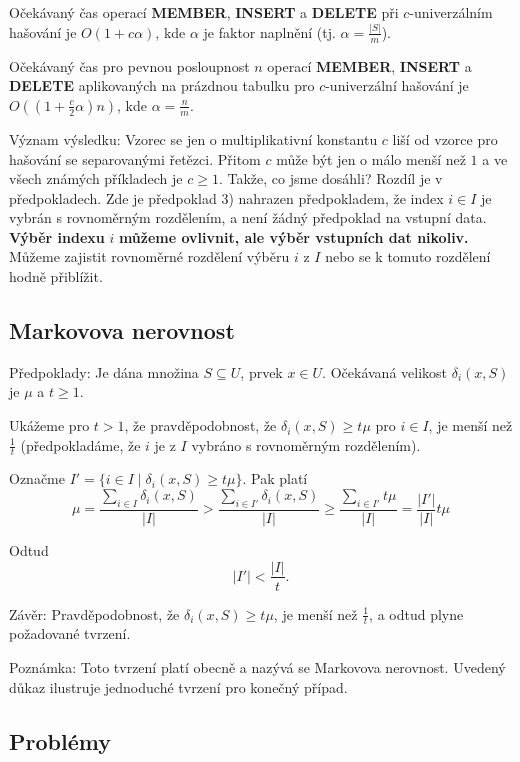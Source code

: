 \documentclass[a4paper,12pt]{article}
\begin{document}
Očekávaný čas operací {\bf MEMBER}, {\bf INSERT }
a {\bf DE\-LETE} při $c$-univerzálním hašování je $
O(1+c\alpha )$, kde 
$\alpha$ je faktor napl\-nění (tj. $\alpha =\frac {|S|}m$).

Očekávaný čas pro pevnou posloupnost $n$ operací 
{\bf MEMBER}, {\bf INSERT} a {\bf DELETE} aplikovaných na prázdnou ta\-bulku 
pro $c$-univerzální hašování je $O((1+\frac c2\alpha 
)n)$, kde $\alpha =\frac nm$.  
\endproclaim

Význam výsledku:  Vzorec se jen o multiplikativní 
konstantu $c$ liší od vzorce pro hašování se separovanými 
řetězci.  Přitom $c$ může být jen o málo menší než $
1$ a 
ve všech známých příkla\-dech je $c\ge 1$.  Takže, co jsme 
dosáhli?  Rozdíl je v předpokla\-dech.  Zde je předpoklad 3) 
nahrazen předpokladem, že index $i\in I$ je vybrán s 
rovnoměrným rozdělením, a není žádný předpoklad na vstupní 
data.  {\bf Výběr indexu} $i$ {\bf můžeme ov\-liv\-nit, ale výběr 
vstupních dat nikoliv.}  Můžeme zajistit rovno\-měr\-né 
rozdělení výběru $i$ z $I$ nebo se k tomuto rozdělení hodně 
přiblížit.  

\subsection{
Markovova nerovnost
}

Předpoklady: Je dána množina $S\subseteq U$, prvek $
x\in U$. 
Očeká\-va\-ná velikost $\delta_i(x,S)$ je $\mu$ a $t\ge 
1$.

Ukážeme pro $t>1$, že pravděpodobnost, že $
\delta_i(x,S)\ge t\mu$ 
pro $i\in I$, je menší než $\frac 1t$ (předpokladáme, že $
i$ je z $I$ vybráno s 
rovnoměrným rozdělením).  

Označme $I'=\{i\in I\mid\delta_i(x,S)\ge t\mu \}$. Pak platí
$$\mu =\frac {\sum_{i\in I}\delta_i(x,S)}{|I|}>\frac {\sum_{i\in 
I'}\delta_i(x,S)}{|I|}\ge\frac {\sum_{i\in I'}t\mu}{|I|}=\frac {|
I'|}{|I|}t\mu$$

Odtud
$$|I'|<\frac {|I|}t.$$

Závěr: Pravděpodobnost, že $\delta_i(x,S)\ge 
t\mu$, je menší 
než $\frac 1t$, a odtud plyne požadované tvrzení. 

Poznámka: Toto tvrzení platí obecně a nazývá 
se Markovova nerovnost. Uvedený důkaz 
ilustruje jednoduché tvrzení pro ko\-neč\-ný případ.

\subsection{
Problémy
}
\end{document}
